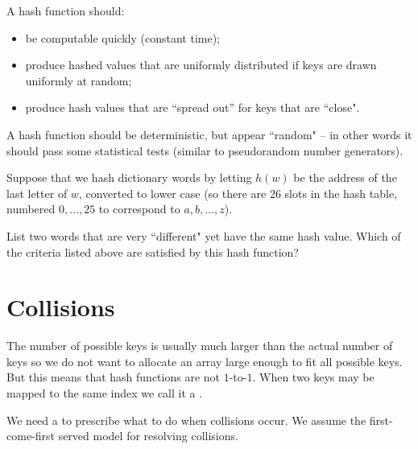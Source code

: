 A hash function should:
\begin{itemize}
\item be computable quickly (constant time);
\item produce hashed values that are uniformly distributed if keys are drawn uniformly at random;
\item produce hash values that are ``spread out'' for keys that are ``close". 
\end{itemize}
A hash function should be deterministic, but appear ``random" -- in other 
words it should pass some statistical tests (similar to pseudorandom number generators). 

\begin{Boxample}[4]
\label{ex:hashfunc}
Suppose that we hash dictionary words by letting $h(w)$ be the address of the last letter of $w$, converted to lower case (so there are 26 slots in the hash table, numbered $0,\dots , 25$ to correspond to $a, b, \dots, z$). 

List two words that are very ``different" yet have the same hash value. Which of the criteria listed above are satisfied by this hash function?
\end{Boxample}

\section{Collisions}
The number of possible keys is usually much larger than the actual number of keys so we do not want to allocate an array large enough to fit all possible keys. 
But this means that hash functions are not $1$-to-$1$. When two keys may be mapped to the same index we call it a . 

We need a  to prescribe what to do when collisions occur. 
We assume the first-come-first served model for resolving collisions.

